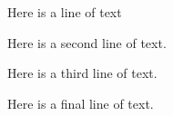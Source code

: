 Here is a line of text\par
\hskip0.25in Here is a second line of text.\par
\kern0.25in Here is a third line of text.\par
\noindent\kern0.25in Here is a final line of text.\par
\bye
